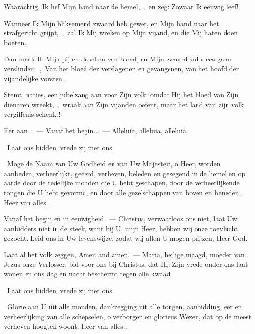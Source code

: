 \documentclass[12pt,twoside,a5paper]{article}
\begin{document}
\begin{halfparskip}

  Waarachtig, Ik hef Mijn hand naar de hemel,~\sep\ en zeg: Zowaar Ik eeuwig leef!

  Wanneer Ik Mijn bliksemend zwaard heb gewet, en Mijn hand naar het strafgericht grijpt,~\sep\ zal Ik Mij wreken op Mijn vijand, en die Mij haten doen boeten.

  Dan maak Ik Mijn pijlen dronken van bloed, en Mijn zwaard zal vlees gaan verslinden:~\sep\ Van het bloed der verslagenen en gevangenen, van het hoofd der vijandelijke vorsten.

  Stemt, naties, een jubelzang aan voor Zijn volk: omdat Hij het bloed van Zijn dienaren wreekt,~\sep\ wraak aan Zijn vijanden oefent, maar het land van zijn volk vergiffenis schenkt!
\end{halfparskip}


\begin{halfparskip}
  Eer aan...~--- Vanaf het begin...~--- Alleluia, alleluia, alleluia.

  \dd~Laat ons bidden; vrede zij met ons.

  \cc~Moge de Naam van Uw Godheid en van Uw Majesteit, o Heer, worden aanbeden, verheerlijkt, geëerd, verheven, beleden en gezegend in de hemel en op aarde door de redelijke monden die U hebt geschapen, door de verheerlijkende tongen die U hebt gevormd, en door alle gezelschappen van boven en beneden, Heer van alles...
\end{halfparskip}



\begin{halfparskip}

  Vanaf het begin en in eeuwigheid.~--- Christus, verwaarloos ons niet, laat Uw aanbidders niet in de steek, want bij U, mijn Heer, hebben wij onze toevlucht gezocht. Leid ons in Uw levenswijze, zodat wij allen U mogen prijzen, Heer God.

  Laat al het volk zeggen, Amen and amen.~--- Maria, heilige maagd, moeder van Jezus onze Verlosser; bid voor ons bij Christus, dat Hij Zijn vrede onder ons laat wonen en ons dag en nacht beschermt tegen alle kwaad.


  \dd~Laat ons bidden, vrede zij met ons.

  \cc~Glorie aan U uit alle monden, dankzegging uit alle tongen, aanbidding, eer en verheerlijking van alle schepselen, o verborgen en glorieus Wezen, dat op de meest verheven hoogten woont, Heer van alles...
\end{halfparskip}
\end{document}
